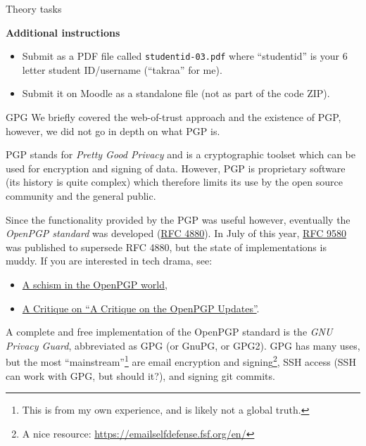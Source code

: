 \documentclass{homework}
\begin{document}
\newpage

\begin{center}
  Theory tasks
\end{center}

\textbf{Additional instructions}

\begin{itemize}
  \item Submit as a PDF file called \texttt{studentid-03.pdf} where \enquote{studentid} is your 6 letter student ID/username (\enquote{takraa} for me).
  \item Submit it on Moodle as a standalone file (not as part of the code ZIP).
\end{itemize}

\begin{task}{GPG}
  We briefly covered the web-of-trust approach and the existence of PGP, however, we did not go in depth on what PGP is.

  PGP stands for \emph{Pretty Good Privacy} and is a cryptographic toolset which can be used for encryption and signing of data.
  However, PGP is proprietary software (its history is quite complex) which therefore limits its use by the open source community and the general public.

  Since the functionality provided by the PGP was useful however, eventually the \emph{OpenPGP standard} was developed (\href{https://datatracker.ietf.org/doc/html/rfc4880}{RFC 4880}).
  In July of this year, \href{https://datatracker.ietf.org/doc/html/rfc9580}{RFC 9580} was published to supersede RFC 4880, but the state of implementations is muddy.
  If you are interested in tech drama, see:
  \begin{itemize}
    \item \href{https://lwn.net/Articles/953797/}{A schism in the OpenPGP world},
    \item \href{https://blog.pgpkeys.eu/critique-critique.html}{A Critique on \enquote{A Critique on the OpenPGP Updates}}.
  \end{itemize}

  A complete and free implementation of the OpenPGP standard is the \emph{GNU Privacy Guard}, abbreviated as GPG (or GnuPG, or GPG2).
  GPG has many uses, but the most \enquote{mainstream}\footnote{This is from my own experience, and is likely not a global truth.} are email encryption and signing\footnote{A nice resource: \url{https://emailselfdefense.fsf.org/en/}}, SSH access (SSH can work with GPG, but should it?), and signing git commits\footnotemark{}.


\end{task}
\end{document}
